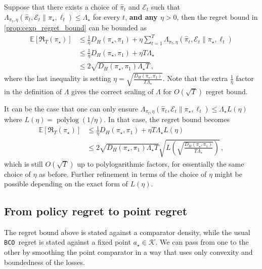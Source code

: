 \documentclass{article}
\theoremstyle{plain}
\theoremstyle{definition}
\theoremstyle{plain}
\newcommand{\Reg}{\mathfrak{R}}
\newcommand{\E}{\mathbb E}
\newcommand{\K}{\mathcal K}
\newcommand{\cE}{\mathcal E}
\newcommand{\polylog}{\operatorname{polylog}}
\newcommand{\bco}{\texttt{BCO}\xspace}
\begin{document}
Suppose that there exists a choice of $\hat{\pi}_t$ and $\cE_t$ such that $\Lambda_{\pi_t,\eta}(\hat{\pi}_t,\cE_t \| \pi_\star, \ell_t) \leq \Lambda_\star$ for every $t$, \textbf{and any $\eta>0$}, then the regret bound in \cref{prop:cexp_regret_bound} can be bounded as
\begin{align}
    \E[\Reg_T(\pi_\star)]
     & \leq
    \frac{1}{\eta}D_H(\pi_\star,\pi_1)
    +
    \eta
    \sum_{t=1}^T
    \Lambda_{\pi_t,\eta}(\hat{\pi}_t,\cE_t \| \pi_\star, \ell_t) \\
     & \leq
    \frac{1}{\eta}D_H(\pi_\star,\pi_1)
    +
    \eta T \Lambda_\star                                         \\
     & \leq
    2\sqrt{D_H(\pi_\star,\pi_1) \Lambda_\star T}\,,
\end{align}
where the last inequality is setting $\eta = \sqrt{\frac{D_H(\pi_\star,\pi_1)}{T\Lambda_\star}}$.
Note that the extra $\frac{1}{\eta}$ factor in the definition of $\Lambda$ gives the correct scaling of $\Lambda$ for $O(\sqrt{T})$ regret bound.


It can be the case that one can only ensure $\Lambda_{\pi_t,\eta}(\hat{\pi}_t,\cE_t \| \pi_\star, \ell_t) \leq \Lambda_\star L(\eta)$ where $L(\eta) = \polylog(1/\eta)$.
In that case, the regret bound becomes
\begin{align}
    \E[\Reg_T(\pi_\star)]
     & \leq
    \frac{1}{\eta}D_H(\pi_\star,\pi_1)
    +
    \eta T \Lambda_\star L(\eta) \\
     & \leq
    2\sqrt{D_H(\pi_\star,\pi_1) \Lambda_\star T} \sqrt{L\left(\sqrt{\frac{D_H(\pi_\star,\pi_1)}{T\Lambda_\star}}\right)}\,,
\end{align}
which is still $O(\sqrt{T})$ up to polylogarithmic factors, for essentially the same choice of $\eta$ as before.
Further refinement in terms of the choice of $\eta$ might be possible depending on the exact form of $L(\eta)$.

\subsection{From policy regret to point regret}
\label{sec:policy_to_point_regret}
The regret bound above is stated against a comparator density, while the usual \bco\ regret is stated
against a fixed point $a_\star\in\K$.  We can pass from one to the other by smoothing the point
comparator in a way that uses only convexity and boundedness of the losses.
\end{document}
